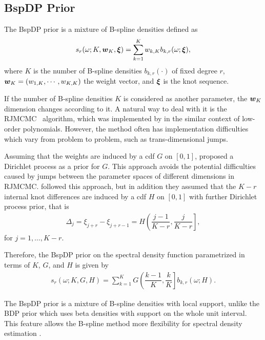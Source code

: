 \documentclass[twocolumn,final]{svjour3}
\newcommand{\bm}[1]{\mbox{\boldmath $#1$}}
\begin{document}

\subsection*{BspDP Prior}
The BspDP prior is a mixture of B-spline densities defined as
\begin{align}
s_r(\omega; K,\bm{w}_K, \bm{\xi}) = \sum_{k=1}^{K} w_{k,K} b_{k,r}(\omega;\bm{\xi}),
\label{eq:bs_prior}	
\end{align}
where $K$ is the number of B-spline densities  $b_{k,r}(\cdot)$ of fixed degree $r$, $\bm{w}_K=(w_{1,K},\cdots, w_{K,K})$ the weight vector, and $\bm{\xi}$ is the knot sequence.

If the number of B-spline densities $K$ is considered as another parameter, the $\bm{w}_K$ dimension changes according to it.  A natural way to deal with it is the RJMCMC~\citep{Green:1995} algorithm, which was implemented by \cite{Gangopadhyay:1999} in the similar context of low-order polynomials.  However, the method often has implementation difficulties which vary from problem to problem, such as trans-dimensional jumps.

Assuming that the weights are induced by a cdf $G$ on $[0,1]$, \cite{Choudhuri:2004} proposed a Dirichlet process as a prior for $G$.  This approach avoids the potential difficulties caused by  jumps between the parameter spaces of different dimensions in  RJMCMC.  \cite{Edwards2018} followed this approach, but in addition they assumed that the $K-r$ internal knot differences are induced by a cdf $H$ on $[0,1]$ with further Dirichlet process prior, that is
\begin{align*}
\Delta_{j} = \xi_{j+r} - \xi_{j+r-1} = H\left(\dfrac{j-1}{K-r}, \dfrac{j}{K-r} \right],
\end{align*}
for $j=1,\dots,K-r$.

Therefore, the BspDP prior on the spectral density function parametrized in terms of $K$, $G$, and $H$ is given by
\begin{align*}
s_r(\omega;K,G,H) = \sum_{k=1}^{K} G \left( \dfrac{k-1}{K} , \dfrac{k}{K} \right] b_{k,r}(\omega;H).
\end{align*}

The BspDP prior is a mixture of B-spline densities with local support, unlike the BDP prior which uses beta densities with  support on the whole unit interval.  This feature allows the B-spline method more flexibility for spectral density estimation \citep{Edwards2018}.
\end{document}
